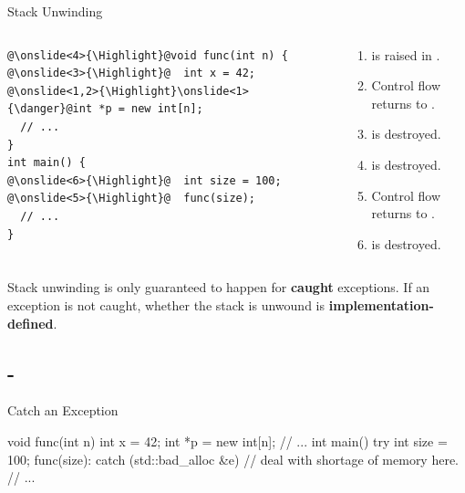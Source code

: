 \documentclass{beamer}
\newcommand{\Highlight}{\makebox[0pt][l]{\color{pink}\rule[-4pt]{\textwidth}{11pt}}}
\begin{document}
\begin{frame}[fragile]{Stack Unwinding}
    \begin{columns}
        \begin{column}{0.4\linewidth}
            \begin{lstlisting}[language = {[11]C++}, escapechar = \@]
@\onslide<4>{\Highlight}@void func(int n) {
@\onslide<3>{\Highlight}@  int x = 42;
@\onslide<1,2>{\Highlight}\onslide<1>{\danger}@int *p = new int[n];
  // ...
}
int main() {
@\onslide<6>{\Highlight}@  int size = 100;
@\onslide<5>{\Highlight}@  func(size);
  // ...
}
            \end{lstlisting}
        \end{column}
        \begin{column}{0.6\linewidth}
            \begin{enumerate}
                \item {} is raised in \ttt{[]}.
                \item Control flow returns to .
                \item {} is destroyed.
                \item {} is destroyed.
                \item Control flow returns to .
                \item {} is destroyed.
            \end{enumerate}
        \end{column}
    \end{columns}
    \begin{notice}
        Stack unwinding is only guaranteed to happen for \textbf{caught} exceptions. If an exception is not caught, whether the stack is unwound is \textbf{implementation-defined}.
    \end{notice}
\end{frame}

\subsection{-}

\begin{frame}[fragile]{Catch an Exception}
    \begin{cpp}
void func(int n) {
  int x = 42;
  int *p = new int[n];
  // ...
}
int main() {
  try {
    int size = 100;
    func(size):
  } catch (std::bad_alloc &e) {
    // deal with shortage of memory here.
  }
  // ...
}
    \end{cpp}
\end{frame}
\end{document}
